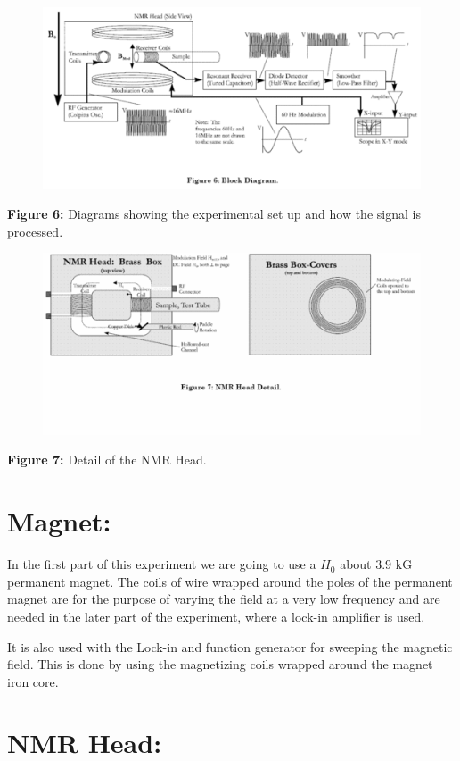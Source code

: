 \documentclass{../lab}
\begin{document}
\begin{figure}[h]
    \centering
    \href{http://experimentationlab.berkeley.edu/sites/default/files/images/500px-NMR10.gif}{\includegraphics[width=0.5\linewidth]{images/500px-NMR10.png}}
    \caption{}
    \label{fig:500px-NMR10}
\end{figure}




\textbf{Figure 6:} Diagrams showing the experimental set up and how the signal is processed.\begin{figure}[h]
    \centering
    \href{http://experimentationlab.berkeley.edu/sites/default/files/images/500px-NMR11.gif}{\includegraphics[width=0.5\linewidth]{images/500px-NMR11.png}}
    \caption{}
    \label{fig:500px-NMR11}
\end{figure}




\textbf{Figure 7:} Detail of the NMR Head.\section{Magnet:}

In the first part of this experiment we are going to use a ${H_0}$ about 3.9 kG permanent magnet. The coils of wire wrapped around the poles of the permanent magnet are for the purpose of varying the field at a very low frequency and are needed in the later part of the experiment, where a lock-in amplifier is used.

It is also used with the Lock-in and function generator for sweeping the magnetic field. This is done by using the magnetizing coils wrapped around the magnet iron core.

\section{NMR Head:}
\end{document}
